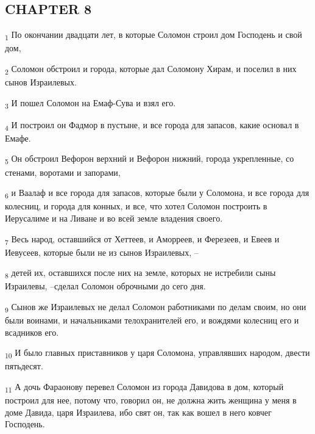 \subsection{CHAPTER 8}
\begin{tcolorbox}
\textsubscript{1} По окончании двадцати лет, в которые Соломон строил дом Господень и свой дом,
\end{tcolorbox}
\begin{tcolorbox}
\textsubscript{2} Соломон обстроил и города, которые дал Соломону Хирам, и поселил в них сынов Израилевых.
\end{tcolorbox}
\begin{tcolorbox}
\textsubscript{3} И пошел Соломон на Емаф-Сува и взял его.
\end{tcolorbox}
\begin{tcolorbox}
\textsubscript{4} И построил он Фадмор в пустыне, и все города для запасов, какие основал в Емафе.
\end{tcolorbox}
\begin{tcolorbox}
\textsubscript{5} Он обстроил Вефорон верхний и Вефорон нижний, города укрепленные, со стенами, воротами и запорами,
\end{tcolorbox}
\begin{tcolorbox}
\textsubscript{6} и Ваалаф и все города для запасов, которые были у Соломона, и все города для колесниц, и города для конных, и все, что хотел Соломон построить в Иерусалиме и на Ливане и во всей земле владения своего.
\end{tcolorbox}
\begin{tcolorbox}
\textsubscript{7} Весь народ, оставшийся от Хеттеев, и Аморреев, и Ферезеев, и Евеев и Иевусеев, которые были не из сынов Израилевых, --
\end{tcolorbox}
\begin{tcolorbox}
\textsubscript{8} детей их, оставшихся после них на земле, которых не истребили сыны Израилевы, --сделал Соломон оброчными до сего дня.
\end{tcolorbox}
\begin{tcolorbox}
\textsubscript{9} Сынов же Израилевых не делал Соломон работниками по делам своим, но они были воинами, и начальниками телохранителей его, и вождями колесниц его и всадников его.
\end{tcolorbox}
\begin{tcolorbox}
\textsubscript{10} И было главных приставников у царя Соломона, управлявших народом, двести пятьдесят.
\end{tcolorbox}
\begin{tcolorbox}
\textsubscript{11} А дочь Фараонову перевел Соломон из города Давидова в дом, который построил для нее, потому что, говорил он, не должна жить женщина у меня в доме Давида, царя Израилева, ибо свят он, так как вошел в него ковчег Господень.
\end{tcolorbox}
